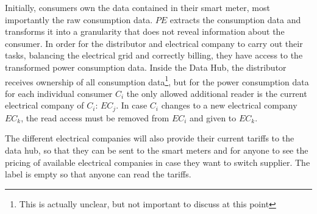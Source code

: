 Initially, consumers own the data contained in their smart meter, most importantly the raw consumption data.
$PE$ extracts the consumption data and transforms it into a granularity that does not reveal information about the consumer.
In order for the distributor and electrical company to carry out their tasks, balancing the electrical grid and correctly billing, they have access to the transformed power consumption data.
Inside the Data Hub, the distributor receives ownership of all consumption data\footnote{This is actually unclear, but not important to discuss at this point}, but for the power consumption data for each individual consumer $C_i$ the only allowed additional reader is the current electrical company of $C_i$: $EC_j$.
In case $C_i$ changes to a new electrical company $EC_k$, the read access must be removed from $EC_i$ and given to $EC_k$.

The different electrical companies will also provide their current tariffs to the data hub, so that they can be sent to the smart meters and for anyone to see the pricing of available electrical companies in case they want to switch supplier.
The label is empty so that anyone can read the tariffs.
